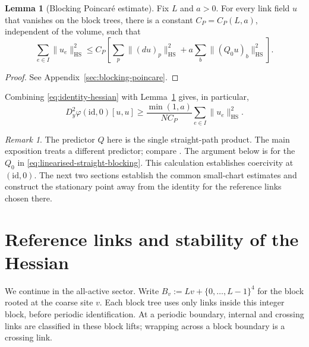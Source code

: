\documentclass[10pt,reqno]{amsart}
\theoremstyle{definition}
\newtheorem{lemma}[definition]{Lemma}
\theoremstyle{remark}
\newtheorem{remark}[definition]{Remark}
\numberwithin{equation}{section}
\numberwithin{figure}{section}
\newcommand{\id}{\mathrm{id}}
\begin{document}
\begin{lemma}[Blocking Poincar\'e estimate]\label{lem:straight-blocking-poincare}
Fix $L$ and $a>0$. For every link field $u$ that vanishes on the block
trees, there is a constant $C_P=C_P(L,a)$, independent of the volume, such that
\begin{equation}\label{eq:straight-blocking-poincare}
\boxed{\sum_{e\in I}\|u_e\|_{\mathrm{HS}}^2
\le C_P\left[\sum_p\|(du)_p\|_{\mathrm{HS}}^2
+a\sum_b\|(Q_0u)_b\|_{\mathrm{HS}}^2\right].}
\end{equation}
\end{lemma}
\begin{proof}
See Appendix~\ref{sec:blocking-poincare}.
\end{proof}
Combining \eqref{eq:identity-hessian} with
Lemma~\ref{lem:straight-blocking-poincare} gives, in particular,
\begin{equation}\label{eq:identity-hessian-lower-bound}
\boxed{D_y^2\varphi(\id,0)[u,u]
\ge\frac{\min(1,a)}{NC_P}\sum_{e\in I}\|u_e\|_{\mathrm{HS}}^2.}
\end{equation}
\begin{remark}
The predictor $Q$ here is the single straight-path product. The main
exposition treats a different predictor; compare
\cite[Lemma~14.11 and Proposition~14.12, pp.~65--66]{Exposition}.
The argument below is for the $Q_0$ in
\eqref{eq:linearised-straight-blocking}. This calculation establishes
coercivity at $(\id,0)$. The next two sections establish the common
small-chart estimates and construct the stationary point away from the
identity for the reference links chosen there.
\end{remark}

\section{Reference links and stability of the Hessian}\label{sec:straight-hessian-stability}
We continue in the all-active sector. Write $B_v:=Lv+\{0,\ldots,L-1\}^4$
for the block rooted at the coarse site $v$. Each block tree uses only
links inside this integer block, before periodic identification.
At a periodic boundary, internal and crossing links are classified in
these block lifts; wrapping across a block boundary is a crossing link.
\end{document}
